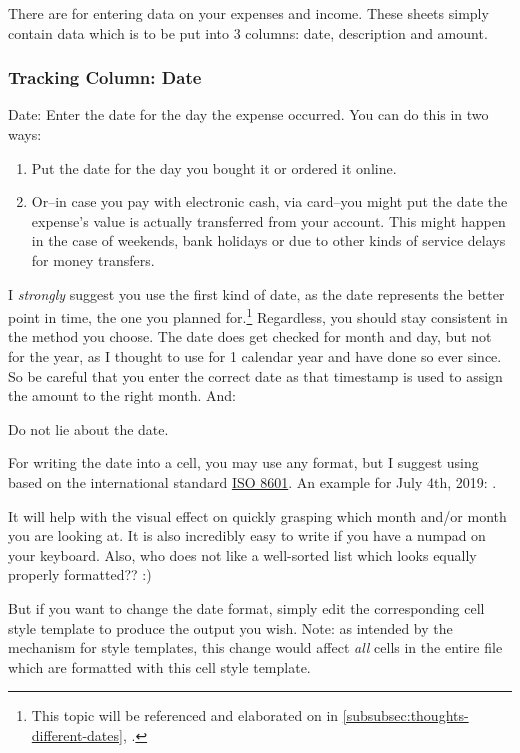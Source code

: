 There are  for entering data on your expenses and income.
These sheets simply contain data which is to be put into 3 columns: date, description and amount.

\subsubsection{Tracking Column: Date}
\label{subsec:tracking-column-date}

Date: Enter the date for the day the expense occurred.
You can do this in two ways:
\begin{enumerate}
	\item Put the date for the day you bought it or ordered it online.
	\item Or--in case you pay with electronic cash, \eg via card--you might put the date the expense's value is actually transferred from your account.
	This might happen in the case of weekends, bank holidays or due to other kinds of service delays for money transfers.
\end{enumerate}
I \emph{strongly} suggest you use the first kind of date, as the date represents the better point in time, \ie the one you planned for.\footnote{This topic will be referenced and elaborated on in \autoref{subsubsec:thoughts-different-dates}, .}
Regardless, you should stay consistent in the method you choose.
The date does get checked for month and day, but not for the year, as I thought to use \tfn for 1 calendar year and have done so ever since.
So be careful that you enter the correct date as that timestamp is used to assign the amount to the right month.
And:

\begin{specialnote}
	Do not lie about the date.
\end{specialnote}

For writing the date into a cell, you may use any format, but I suggest using  based on the international standard \href{https://en.wikipedia.org/wiki/ISO_8601}{ISO 8601}.
An example for July 4th, 2019: .

It will help with the visual effect on quickly grasping which month and/or month you are looking at.
It is also incredibly easy to write if you have a numpad on your keyboard.
Also, who does not like a well-sorted list which looks equally properly formatted?? :)

But if you want to change the date format, simply edit the corresponding cell style template to produce the output you wish.
Note: as intended by the mechanism for style templates, this change would affect \emph{all} cells in the entire file which are formatted with this cell style template.

